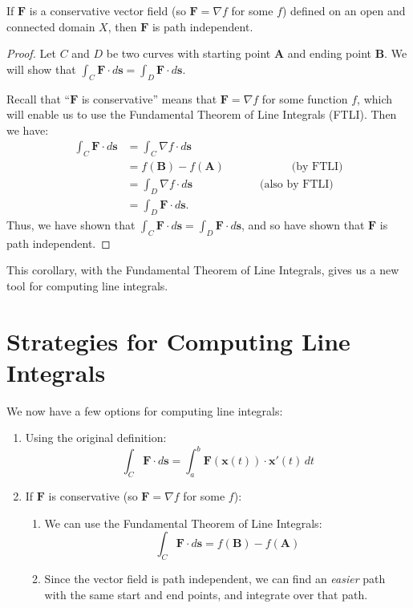 \documentclass{ximera}
\begin{document}
\begin{corollary}
If $\textbf{F}$ is a conservative vector field (so $\textbf{F}=\nabla f$ for some $f$) defined on an open and connected domain $X$, then $\textbf{F}$ is path independent.
\end{corollary}

\begin{proof}
Let $C$ and $D$ be two curves with starting point $\textbf{A}$ and ending point $\textbf{B}$. We will show that $\int_C\textbf{F}\cdot d\textbf{s}=\int_D\textbf{F}\cdot d\textbf{s}$.

Recall that ``$\textbf{F}$ is conservative'' means that $\textbf{F}=\nabla f$ for some function $f$, which will enable us to use the Fundamental Theorem of Line Integrals (FTLI). Then we have:
\begin{align*}
\int_C\textbf{F}\cdot d\textbf{s} &= \int_C\nabla f\cdot d\textbf{s}\\
&= f(\textbf{B})-f(\textbf{A})\hspace{1in}\textrm{(by FTLI)}\\
&= \int_D\nabla f\cdot d\textbf{s}\hspace{1in}\textrm{(also by FTLI)}\\
&= \int_D\textbf{F}\cdot d\textbf{s}.
\end{align*}
Thus, we have shown that $\int_C\textbf{F}\cdot d\textbf{s}=\int_D\textbf{F}\cdot d\textbf{s}$, and so have shown that $\textbf{F}$ is path independent.
\end{proof}

This corollary, with the Fundamental Theorem of Line Integrals, gives us a new tool for computing line integrals.

\section{Strategies for Computing Line Integrals}

We now have a few options for computing line integrals:

\begin{enumerate}
\item Using the original definition:
\[
\int_C\textbf{F}\cdot d\textbf{s} = \int_a^b\textbf{F}(\textbf{x}(t))\cdot \textbf{x}'(t)\,dt
\]
\item If $\textbf{F}$ is conservative (so $\textbf{F}=\nabla f$ for some $f$):
\begin{enumerate}
\item We can use the Fundamental Theorem of Line Integrals: 
\[
\int_C\textbf{F}\cdot d\textbf{s} = f(\textbf{B})-f(\textbf{A})
\]
\item Since the vector field is path independent, we can find an \emph{easier} path with the same start and end points, and integrate over that path.
\end{enumerate}
\end{enumerate}
\end{document}
